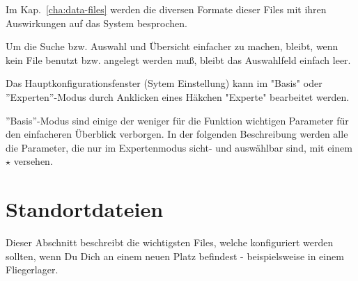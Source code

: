 Im Kap.~\ref{cha:data-files} werden die diversen Formate dieser Files mit ihren
Auswirkungen auf das System besprochen.

Um die Suche bzw. Auswahl und Übersicht einfacher zu machen, bleibt,
wenn kein File benutzt bzw. angelegt werden muß, bleibt das Auswahlfeld einfach leer.

Das Hauptkonfigurationsfenster (Sytem Einstellung) kann im "Basis" oder
''Experten''-Modus durch Anklicken eines Häkchen "Experte" bearbeitet werden.

''Basis''-Modus sind einige der weniger für die Funktion wichtigen Parameter für den
einfacheren Überblick verborgen. In der folgenden Beschreibung werden alle die
Parameter, die nur im Expertenmodus sicht- und auswählbar sind, mit
einem $\star$ versehen.
\section{Standortdateien}\label{sec:site-files}
Dieser Abschnitt beschreibt die wichtigsten Files, welche konfiguriert werden sollten, wenn
Du Dich an einem neuen Platz befindest - beispielsweise in einem Fliegerlager.

